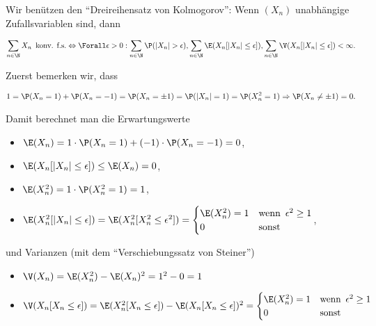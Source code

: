 \begin{solution}

Wir benützen den \enquote{Dreireihensatz von Kolmogorov}: Wenn $(X_n)$ unabhängige Zufallsvariablen sind, dann

\begin{align*}
  \sum_{n \in \N} X_n
  \enspace \text{konv. f.s.}
  \Leftrightarrow
  \Forall \epsilon > 0:
  \sum_{n \in \N} \P(|X_n| > \epsilon),
  \sum_{n \in \N} \E(X_n [|X_n| \leq \epsilon]),
  \sum_{n \in \N} \V(X_n [|X_n| \leq \epsilon])
  < \infty.
\end{align*}

Zuerst bemerken wir, dass

\begin{align*}
  1
  =
  \P(X_n = 1) + \P(X_n = -1)
  =
  \P(X_n = \pm 1)
  =
  \P(|X_n| = 1)
  =
  \P(X_n^2 = 1)
  \Rightarrow
  \P(X_n \neq \pm 1) = 0.
\end{align*}

Damit berechnet man die Erwartungswerte

\begin{itemize}

  \item $\E(X_n) = 1 \cdot \P(X_n = 1) + (-1) \cdot \P(X_n = -1) = 0$,

  \item $\E(X_n [|X_n| \leq \epsilon]) \leq \E(X_n) = 0$,

  \item $\E(X_n^2) = 1 \cdot \P(X_n^2 = 1) = 1$,

  \item $\E(X_n^2 [|X_n| \leq \epsilon]) = \E(X_n^2 [X_n^2 \leq \epsilon^2]) =
  \begin{cases}
    \E(X_n^2) = 1 & \text{wenn} \enspace \epsilon^2 \geq 1 \\
    0             & \text{sonst}
  \end{cases}$,

\end{itemize}

und Varianzen (mit dem \enquote{Verschiebungssatz von Steiner})

\begin{itemize}

  \item $\V(X_n) = \E(X_n^2) - \E(X_n)^2 = 1^2 - 0 = 1$

  \item $\V(X_n [X_n \leq \epsilon]) = \E(X_n^2 [X_n \leq \epsilon]) - \E(X_n [X_n \leq \epsilon])^2 =
  \begin{cases}
    \E(X_n^2) = 1 & \text{wenn} \enspace \epsilon^2 \geq 1 \\
    0             & \text{sonst}
  \end{cases}$


\end{itemize}
\end{solution}

